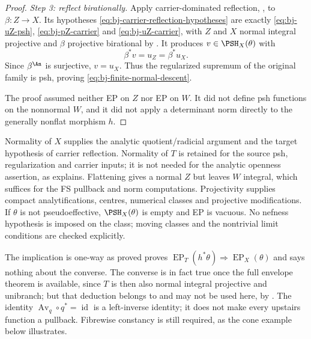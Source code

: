 \begin{proof}
\medskip
\noindent\emph{Step 3: reflect birationally.}
Apply carrier-dominated reflection,
, to $\beta:Z\to X$.  Its hypotheses
\eqref{eq:bj-carrier-reflection-hypotheses} are exactly
\eqref{eq:bj-uZ-psh}, \eqref{eq:bj-pZ-carrier} and
\eqref{eq:bj-uZ-carrier}, with $Z$ and $X$ normal integral projective
and $\beta$ projective birational by
.  It produces
$v\in\PSH_X(\theta)$ with
\[
                         \beta^*v=u_Z=\beta^*u_X.
\]
Since $\beta^{\An}$ is surjective, $v=u_X$.  Thus the regularized
supremum of the original family is psh, proving
\eqref{eq:bj-finite-normal-descent}.

The proof assumed neither EP on $Z$ nor EP on $W$.  It did not define
psh functions on the nonnormal $W$, and it did not apply a determinant
norm directly to the generally nonflat morphism $h$.
\end{proof}

\begin{remark}
\label{rem:ch41-descent-hypothesis-map}
Normality of $X$ supplies the analytic quotient/radicial argument
and the target hypothesis of carrier reflection.  Normality of $T$
is retained for the source psh, regularization and carrier inputs;
it is not needed for the analytic openness assertion, as
 explains.  Flattening gives a normal
$Z$ but leaves $W$ integral, which suffices for the FS pullback and
norm computations.  Projectivity supplies compact analytifications,
centres, numerical classes and projective modifications.
If $\theta$ is not pseudoeffective, $\PSH_X(\theta)$ is empty and EP
is vacuous.  No nefness hypothesis is imposed on the class; moving
classes and the nontrivial limit conditions are checked explicitly.
\end{remark}

\begin{warning}{The implication is one-way as proved}
\label{warn:ch41-one-way}
 proves
$\operatorname{EP}_T(h^*\theta)\Rightarrow\operatorname{EP}_X(\theta)$
and says nothing about the converse.  The converse is in fact true once the
full envelope theorem is available, since $T$ is then also normal
integral projective and unibranch; but that deduction belongs to
 and may not be used here, by
.  The identity
$\operatorname{Av}_q\circ q^*=\operatorname{id}$ is a left-inverse
identity; it does not make every upstairs function a pullback.
Fibrewise constancy is still required, as the cone example below
illustrates.
\end{warning}

